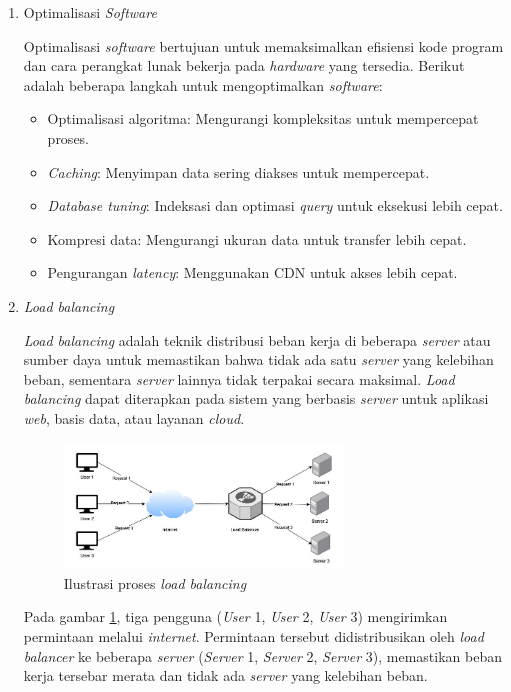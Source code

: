 \documentclass[12pt]{article}
\begin{document}
\begin{enumerate}
\begin{enumerate}
            \item Optimalisasi \textit{Software}
            \par Optimalisasi \textit{software} bertujuan untuk memaksimalkan efisiensi kode program dan cara perangkat lunak bekerja pada \textit{hardware} yang tersedia. Berikut adalah beberapa langkah untuk mengoptimalkan \textit{software}:
            \begin{itemize}
                \item Optimalisasi algoritma: Mengurangi kompleksitas untuk mempercepat proses.
                \item \textit{Caching}: Menyimpan data sering diakses untuk mempercepat.
                \item \textit{Database tuning}: Indeksasi dan optimasi \textit{query} untuk eksekusi lebih cepat.
                \item Kompresi data: Mengurangi ukuran data untuk transfer lebih cepat.
                \item Pengurangan \textit{latency}: Menggunakan CDN untuk akses lebih cepat.
            \end{itemize}
            
            \item \textit{Load balancing}
            \par \textit{Load balancing} adalah teknik distribusi beban kerja di beberapa \textit{server} atau sumber daya untuk memastikan bahwa tidak ada satu \textit{server} yang kelebihan beban, sementara \textit{server} lainnya tidak terpakai secara maksimal. \textit{Load balancing} dapat diterapkan pada sistem yang berbasis \textit{server} untuk aplikasi \textit{web}, basis data, atau layanan \textit{cloud}.
            \begin{figure}[h]
                \centering
                \includegraphics[width=0.7\textwidth] {asset/proses_load_balancing.jpg} 
                \caption{Ilustrasi proses \textit{load balancing}}
                \label{fig:proses_load_balancing}
            \end{figure}
            \par Pada gambar \ref{fig:proses_load_balancing}, tiga pengguna (\textit{User} 1, \textit{User} 2, \textit{User} 3) mengirimkan permintaan melalui \textit{internet}. Permintaan tersebut didistribusikan oleh \textit{load balancer} ke beberapa \textit{server} (\textit{Server} 1, \textit{Server} 2, \textit{Server} 3), memastikan beban kerja tersebar merata dan tidak ada \textit{server} yang kelebihan beban.
        \end{enumerate}
\end{enumerate}
\end{document}

